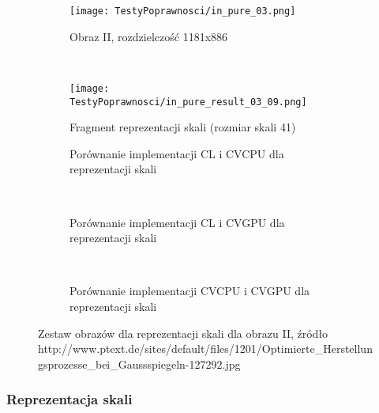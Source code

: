\begin{figure}[h]
\begin{center}
\begin{subfigure}[t]{0.3\textwidth}
\texttt{[image: TestyPoprawnosci/in\_pure\_03.png]}
\caption{Obraz II, rozdzielczość 1181x886}
\label{fig:valPure03}
\end{subfigure}
~
\begin{subfigure}[t]{0.3\textwidth}
\begin{center}
\texttt{[image: TestyPoprawnosci/in\_pure\_result\_03\_09.png]}
\end{center}
\caption{Fragment reprezentacji skali (rozmiar skali 41)}
\label{fig:valPure03}
\end{subfigure}
\end{center}

\begin{subfigure}[t]{0.3\textwidth}
	\centering
	\setlength\fboxsep{0pt}
	\setlength\fboxrule{0.5pt}
	\caption{Porównanie implementacji CL i CVCPU dla reprezentacji skali}
	\label{fig:valPure3CLCVCPU}
\end{subfigure}
~
\begin{subfigure}[t]{0.3\textwidth}
	\centering
	\setlength\fboxsep{0pt}
	\setlength\fboxrule{0.5pt}
	\caption{Porównanie implementacji CL i CVGPU dla reprezentacji skali}
	\label{fig:valPure3CLCVGPU}
\end{subfigure}
~
\begin{subfigure}[t]{0.3\textwidth}
	\centering
	\setlength\fboxsep{0pt}
	\setlength\fboxrule{0.5pt}
	\caption{Porównanie implementacji CVCPU i CVGPU dla reprezentacji skali}
	\label{fig:valPure3CVCPUCVGPU}                 
\end{subfigure}
\caption{Zestaw obrazów dla reprezentacji skali dla obrazu II, \tiny{źródło http://www.ptext.de/sites/default/files/1201/Optimierte\_Herstellungsprozesse\_bei\_Gaussspiegeln-127292.jpg}}

\label{fig:valPure3}
\end{figure}

\subsubsection{Reprezentacja skali}
\label{subsubsec:reprezentacjaSkaliRysunki}


